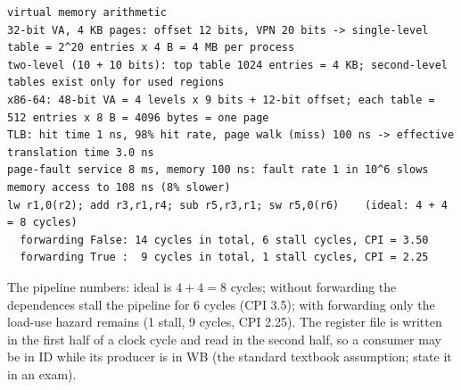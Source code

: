 \documentclass[10pt,a4paper,openany,oneside]{report}
\begin{document}
\begin{lstlisting}[style=out,basicstyle=\ttfamily\fontsize{7.2}{8.6}\selectfont,title={Captured output}]
virtual memory arithmetic
32-bit VA, 4 KB pages: offset 12 bits, VPN 20 bits -> single-level table = 2^20 entries x 4 B = 4 MB per process
two-level (10 + 10 bits): top table 1024 entries = 4 KB; second-level tables exist only for used regions
x86-64: 48-bit VA = 4 levels x 9 bits + 12-bit offset; each table = 512 entries x 8 B = 4096 bytes = one page
TLB: hit time 1 ns, 98% hit rate, page walk (miss) 100 ns -> effective translation time 3.0 ns
page-fault service 8 ms, memory 100 ns: fault rate 1 in 10^6 slows memory access to 108 ns (8% slower)
lw r1,0(r2); add r3,r1,r4; sub r5,r3,r1; sw r5,0(r6)    (ideal: 4 + 4 = 8 cycles)
  forwarding False: 14 cycles in total, 6 stall cycles, CPI = 3.50
  forwarding True :  9 cycles in total, 1 stall cycles, CPI = 2.25
\end{lstlisting}
The pipeline numbers: ideal is $4+4=8$ cycles; without forwarding the dependences stall the pipeline for 6 cycles (CPI 3.5); with forwarding only the load-use hazard remains (1 stall, 9 cycles, CPI 2.25). The register file is written in the first half of a clock cycle and read in the second half, so a consumer may be in ID while its producer is in WB (the standard textbook assumption; state it in an exam).
\end{document}
